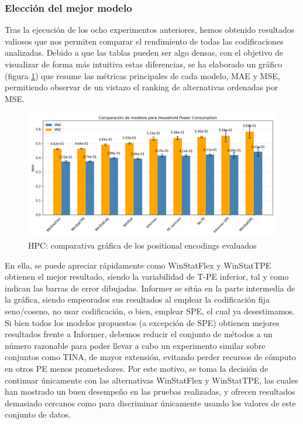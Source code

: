 \subsubsection{Elección del mejor modelo}

Tras la ejecución de los ocho experimentos anteriores, hemos obtenido resultados valiosos que nos permiten comparar el rendimiento de todas las codificaciones analizadas. Debido a que las tablas pueden ser algo densas, con el objetivo de visualizar de forma más intuitiva estas diferencias, se ha elaborado un gráfico (figura \ref{hpcgraph}) que resume las métricas principales de cada modelo, MAE y MSE, permitiendo observar de un vistazo el ranking de alternativas ordenadas por MSE.\\

\begin{figure}[!ht]
	\centering
	\includegraphics[scale=0.475]{img/hpcgraph}
	\caption{HPC: comparativa gráfica de los positional encodings evaluados}
	\label{hpcgraph}
\end{figure}

En ella, se puede apreciar rápidamente como WinStatFlex y WinStatTPE obtienen el mejor resultado, siendo la variabilidad de T-PE inferior, tal y como indican las barras de error dibujadas.  Informer se sitúa en la parte intermedia de la gráfica, siendo empeorados sus resultados al emplear la codificación fija seno/coseno, no usar codificación, o bien, emplear SPE, el cual ya desestimamos.\\

Si bien todos los modelos propuestos (a excepción de SPE) obtienen mejores resultados frente a Informer, debemos reducir el conjunto de métodos a un número razonable para poder llevar a cabo un experimento similar sobre conjuntos como TINA, de mayor extensión, evitando perder recursos de cómputo en otros PE menos prometedores. Por este motivo, se toma la decisión de continuar únicamente con las alternativas WinStatFlex y WinStatTPE, las cuales han mostrado un buen desempeño en las pruebas realizadas, y ofrecen resultados demasiado cercanos como para discriminar únicamente usando los valores de este conjunto de datos.\\


